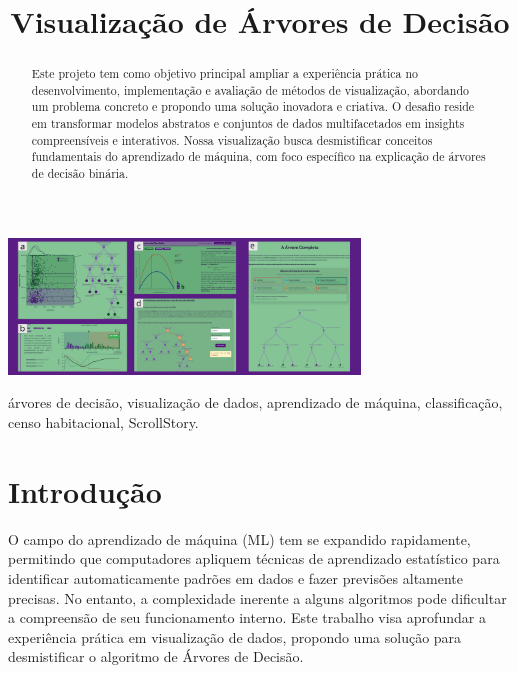\documentclass[conference]{IEEEtran}
\begin{document}
\title{Visualização de Árvores de Decisão}

\author{
\and
{}
\and
{}
}

\maketitle

\begin{strip}
  \centering
  \includegraphics[width=0.7\textwidth]{teaser.pdf.png}
  \label{fig:teaser}
\end{strip}


\begin{abstract}
Este projeto tem como objetivo principal ampliar a experiência prática no desenvolvimento, implementação e avaliação de métodos de visualização, abordando um problema concreto e propondo uma solução inovadora e criativa. O desafio reside em transformar modelos abstratos e conjuntos de dados multifacetados em insights compreensíveis e interativos. Nossa visualização busca desmistificar conceitos fundamentais do aprendizado de máquina, com foco específico na explicação de árvores de decisão binária.
\end{abstract}

\begin{IEEEkeywords}
árvores de decisão, visualização de dados, aprendizado de máquina, classificação, censo habitacional, ScrollStory.
\end{IEEEkeywords}

\section{Introdução}
O campo do aprendizado de máquina (ML) tem se expandido rapidamente, permitindo que computadores apliquem técnicas de aprendizado estatístico para identificar automaticamente padrões em dados e fazer previsões altamente precisas. No entanto, a complexidade inerente a alguns algoritmos pode dificultar a compreensão de seu funcionamento interno. Este trabalho visa aprofundar a experiência prática em visualização de dados, propondo uma solução para desmistificar o algoritmo de Árvores de Decisão.
\end{document}
